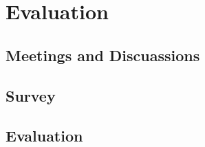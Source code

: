 \chapter{Evaluation}\label{chapter:Evaluation}

\section{Meetings and Discuassions}
\section{Survey}
\section{Evaluation}